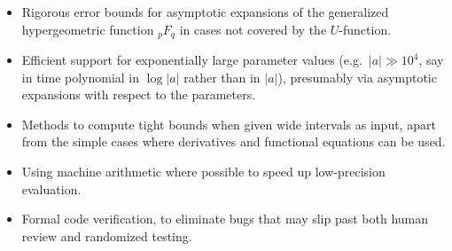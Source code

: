 \documentclass[11pt]{article}
\begin{document}
\begin{itemize}
\item Rigorous error bounds for asymptotic expansions
of the generalized hypergeometric function ${}_pF_q$ in cases
not covered by the $U$-function.
\item Efficient support for exponentially large parameter values (e.g.\ $|a| \gg 10^4$, say
in time polynomial in $\log |a|$ rather than in $|a|$), presumably
via asymptotic expansions with respect to the parameters.
\item Methods to compute tight bounds when given wide intervals as input,
apart from the simple cases where derivatives and functional
equations can be used.
\item Using machine arithmetic where possible to speed up low-precision evaluation.
\item Formal code verification, to eliminate bugs that
may slip past both human review and randomized testing.
\end{itemize}




\end{document}
